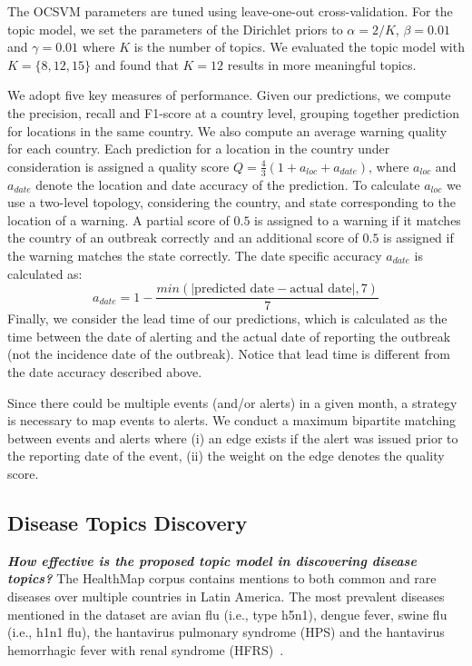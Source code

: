 \documentclass[twoside,leqno,twocolumn]{article}
\begin{document}
 The OCSVM parameters are tuned using leave-one-out cross-validation. For the topic model, we set the parameters of the Dirichlet priors to $\alpha = 2/K$, $\beta = 0.01$ and $\gamma = 0.01$ where $K$ is the number of topics. We evaluated the topic model with $K = \{8, 12, 15\}$ and found that $K=12$ results in more meaningful topics.  


 We adopt five key measures of performance. Given our predictions, we compute the precision, recall and F1-score at a country level, grouping together prediction for locations in the same country. We also compute an average warning quality for each country. Each prediction for a location in the country under consideration is assigned a quality score $Q = \frac{4}{3}(1 + a_{loc} + a_{date})$, where $a_{loc}$ and $a_{date}$ denote the location and date accuracy of the prediction. To calculate $a_{loc}$ we use a two-level topology, considering the country, and state corresponding to the location of a warning. A partial score of $0.5$ is assigned to a warning if it matches the country of an outbreak correctly and an additional score of $0.5$ is assigned if the warning matches the state correctly. The date specific accuracy $a_{date}$ is calculated as: 
\begin{equation} 
a_{date} = 1 - \frac{min(|\mbox{predicted date} - \mbox{actual date}|,7)}{7}
\end{equation} 
Finally, we consider the lead time of our predictions, which is calculated as the time between the date of alerting and the actual date of reporting the outbreak (not the incidence date of the outbreak). Notice that lead time is different from the date accuracy described above.  

 Since there could be multiple events (and/or alerts) in a given month, a strategy is necessary to map events to alerts. We conduct a maximum bipartite matching between events and alerts where (i) an edge exists if the alert was issued prior to the reporting date of the event, (ii) the weight on the edge denotes the quality score. 
\vspace{-10pt}
\subsection{Disease Topics Discovery} \textbf{{\em How effective is the proposed topic model in discovering disease topics?}} The HealthMap corpus contains mentions to both common and rare diseases over multiple countries in Latin America. The most prevalent diseases mentioned in the dataset are avian flu (i.e., type h5n1), dengue fever, swine flu (i.e., h1n1 flu), the hantavirus pulmonary syndrome (HPS) and the hantavirus hemorrhagic fever with renal syndrome (HFRS)~\cite{jonsson:10}. 
\end{document}
